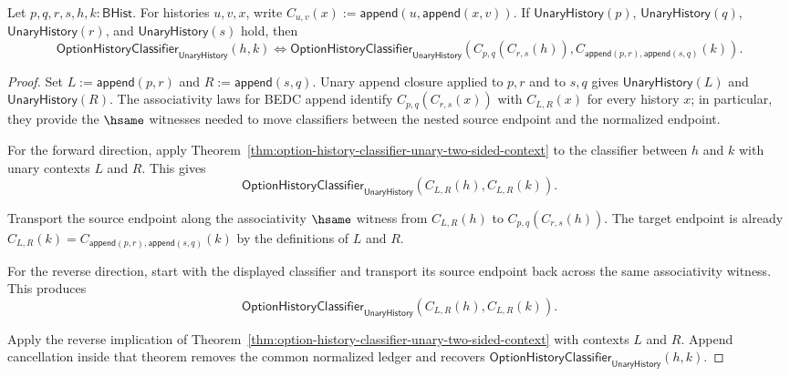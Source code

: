 \begin{theorem}
\label{thm:option-unary-context-composition}
Let $p,q,r,s,h,k:\mathsf{BHist}$. For histories $u,v,x$, write
$C_{u,v}(x):=\mathsf{append}(u,\mathsf{append}(x,v))$. If
$\mathsf{UnaryHistory}(p)$, $\mathsf{UnaryHistory}(q)$,
$\mathsf{UnaryHistory}(r)$, and $\mathsf{UnaryHistory}(s)$ hold, then
$$
\mathsf{OptionHistoryClassifier}_{\mathsf{UnaryHistory}}(h,k)
\Longleftrightarrow
\mathsf{OptionHistoryClassifier}_{\mathsf{UnaryHistory}}
  (C_{p,q}(C_{r,s}(h)),
   C_{\mathsf{append}(p,r),\mathsf{append}(s,q)}(k)).
$$
\end{theorem}
\begin{proof}
Set $L:=\mathsf{append}(p,r)$ and $R:=\mathsf{append}(s,q)$. Unary append
closure applied to $p,r$ and to $s,q$ gives $\mathsf{UnaryHistory}(L)$ and
$\mathsf{UnaryHistory}(R)$. The associativity laws for BEDC append identify
$C_{p,q}(C_{r,s}(x))$ with $C_{L,R}(x)$ for every history $x$; in particular,
they provide the $\hsame$ witnesses needed to move classifiers between the
nested source endpoint and the normalized endpoint.

For the forward direction, apply
Theorem~\ref{thm:option-history-classifier-unary-two-sided-context} to the
classifier between $h$ and $k$ with unary contexts $L$ and $R$. This gives
$$
\mathsf{OptionHistoryClassifier}_{\mathsf{UnaryHistory}}
  (C_{L,R}(h),C_{L,R}(k)).
$$

Transport the source endpoint along the associativity $\hsame$ witness from
$C_{L,R}(h)$ to $C_{p,q}(C_{r,s}(h))$. The target endpoint is already
$C_{L,R}(k)=C_{\mathsf{append}(p,r),\mathsf{append}(s,q)}(k)$ by the
definitions of $L$ and $R$.

For the reverse direction, start with the displayed classifier and transport
its source endpoint back across the same associativity witness. This produces
$$
\mathsf{OptionHistoryClassifier}_{\mathsf{UnaryHistory}}
  (C_{L,R}(h),C_{L,R}(k)).
$$

Apply the reverse implication of
Theorem~\ref{thm:option-history-classifier-unary-two-sided-context} with
contexts $L$ and $R$. Append cancellation inside that theorem removes the
common normalized ledger and recovers
$\mathsf{OptionHistoryClassifier}_{\mathsf{UnaryHistory}}(h,k)$.
\end{proof}

